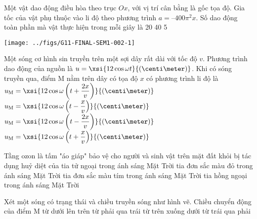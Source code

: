 \begin{ex}
Một vật dao động điều hòa theo trục $Ox$, với vị trí cân bằng là gốc tọa độ. Gia tốc của vật phụ thuộc vào li độ theo phương trình $a=–400\pi^2 x$. Số dao động toàn phần mà vật thực hiện trong mỗi giây là
	\choice
	{20}
	{}
	{40}
	{5}
	\loigiai{}
\end{ex}
\begin{ex}
	{\vspace{-0.5cm}\texttt{[image: ../figs/G11-FINAL-SEM1-002-1]}}
	\loigiai{}
\end{ex}
\begin{ex}
Một sóng cơ hình sin truyền trên một sợi dây rất dài với tốc độ $v$. Phương trình dao động của nguồn là $u=\xsi{12\cos\omega t}{\left(\centi\meter\right)}$. Khi có sóng truyền qua, điểm M nằm trên dây có tọa độ $x$ có phương trình li độ là
	\choice
	{$u_{\mathrm{M}}=\xsi{12\cos\omega\left(t+\dfrac{2x}{v}\right)}{\left(\centi\meter\right)}$}
	{\True $u_{\mathrm{M}}=\xsi{12\cos\omega\left(t-\dfrac{x}{v}\right)}{\left(\centi\meter\right)}$}
	{$u_{\mathrm{M}}=\xsi{12\cos\omega\left(t-\dfrac{2x}{v}\right)}{\left(\centi\meter\right)}$}
	{$u_{\mathrm{M}}=\xsi{12\cos\omega\left(t+\dfrac{x}{v}\right)}{\left(\centi\meter\right)}$}
	\loigiai{}
\end{ex}
\begin{ex}
Tầng ozon là tấm "áo giáp" bảo vệ cho người và sinh vật trên mặt đất khỏi bị tác dụng huỷ diệt của
	\choice
	{\True tia tử ngoại trong ánh sáng Mặt Trời}
	{tia đơn sắc màu đỏ trong ánh sáng Mặt Trời}
	{tia đơn sắc màu tím trong ánh sáng Mặt Trời}
	{tia hồng ngoại trong ánh sáng Mặt Trời}
	\loigiai{}
\end{ex}
\begin{ex}
Xét một sóng có trạng thái và chiều truyền sóng như hình vẽ. Chiều chuyển động của điểm M
	\choice
	{\True từ dưới lên trên}
	{từ phải qua trái}
	{từ trên xuống dưới}
	{từ trái qua phải}
	\loigiai{}
\end{ex}
